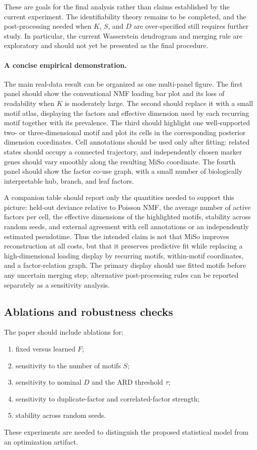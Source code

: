 \documentclass[11pt]{article}
\theoremstyle{plain}
\theoremstyle{definition}
\begin{document}
These are goals for the final analysis rather than claims established by the
current experiment. The identifiability theory remains to be completed, and
the post-processing needed when $K$, $S$, and $D$ are over-specified still
requires further study. In particular, the current Wasserstein dendrogram and
merging rule are exploratory and should not yet be presented as the final
procedure.

\paragraph{A concise empirical demonstration.}
The main real-data result can be organized as one multi-panel figure. The first
panel should show the conventional NMF loading bar plot and its loss of
readability when $K$ is moderately large. The second should replace it with a
small motif atlas, displaying the factors and effective dimension used by each
recurring motif together with its prevalence. The third should highlight one
well-supported two- or three-dimensional motif and plot its cells in the
corresponding posterior dimension coordinates. Cell annotations should be used
only after fitting: related states should occupy a connected trajectory, and
independently chosen marker genes should vary smoothly along the resulting
MiSo coordinate. The fourth panel should show the factor co-use graph, with a
small number of biologically interpretable hub, branch, and leaf factors.

A companion table should report only the quantities needed to support this
picture: held-out deviance relative to Poisson NMF, the average number of active
factors per cell, the effective dimensions of the highlighted motifs,
stability across random seeds, and external agreement with cell annotations
or an independently estimated pseudotime. Thus the intended claim is not that
MiSo improves reconstruction at all costs, but that it preserves predictive fit
while replacing a high-dimensional loading display by recurring motifs,
within-motif coordinates, and a factor-relation graph. The primary display
should use fitted motifs before any uncertain merging step; alternative
post-processing rules can be reported separately as a sensitivity analysis.

\subsection{Ablations and robustness checks}

The paper should include ablations for:
\begin{enumerate}
  \item fixed versus learned $F$;
  \item sensitivity to the number of motifs $S$;
  \item sensitivity to nominal $D$ and the ARD threshold $\tau$;
  \item sensitivity to duplicate-factor and correlated-factor strength;
  \item stability across random seeds.
\end{enumerate}
These experiments are needed to distinguish the proposed statistical model from
an optimization artifact.
\end{document}
